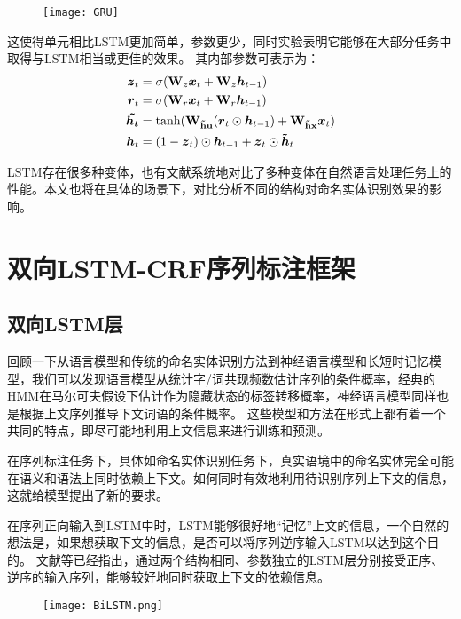\begin{figure}[H]
    \centering
    \texttt{[image: GRU]}
    \label{fig:GRU}
\end{figure}
这使得单元相比LSTM更加简单，参数更少，同时实验表明它能够在大部分任务中取得与LSTM相当或更佳的效果。
其内部参数可表示为：
\begin{align}
    \boldsymbol{z}_t &= \sigma(\boldsymbol{\mathbf{W}}_{z}\boldsymbol{x}_t + \boldsymbol{\mathbf{W}}_{z}\boldsymbol{h}_{t-1})\\
    \boldsymbol{r}_t &= \sigma(\boldsymbol{\mathbf{W}}_{r}\boldsymbol{x}_t + \boldsymbol{\mathbf{W}}_{r}\boldsymbol{h}_{t-1})\\
    \boldsymbol{\tilde{h_t}} &= \tanh(\boldsymbol{\mathbf{W_{\tilde{h}u}}}(\boldsymbol{r}_t \odot \boldsymbol{h}_{t-1}) + \boldsymbol{\mathbf{W_{\tilde{h}x}}}\boldsymbol{x}_t)\\
    \boldsymbol{h}_t &= (1 - \boldsymbol{z}_t) \odot \boldsymbol{h}_{t-1} + \boldsymbol{z}_t \odot \boldsymbol{\tilde{h}}_t
\end{align}

LSTM存在很多种变体，也有文献系统地对比了多种变体在自然语言处理任务上的性能。本文也将在具体的场景下，对比分析不同的结构对命名实体识别效果的影响。

\section{双向LSTM-CRF序列标注框架}
\subsection{双向LSTM层}
回顾一下从语言模型和传统的命名实体识别方法到神经语言模型和长短时记忆模型，我们可以发现语言模型从统计字/词共现频数估计序列的条件概率，经典的HMM在马尔可夫假设下估计作为隐藏状态的标签转移概率，神经语言模型同样也是根据上文序列推导下文词语的条件概率。
这些模型和方法在形式上都有着一个共同的特点，即尽可能地利用上文信息来进行训练和预测。

在序列标注任务下，具体如命名实体识别任务下，真实语境中的命名实体完全可能在语义和语法上同时依赖上下文。如何同时有效地利用待识别序列上下文的信息，这就给模型提出了新的要求。

在序列正向输入到LSTM中时，LSTM能够很好地“记忆”上文的信息，一个自然的想法是，如果想获取下文的信息，是否可以将序列逆序输入LSTM以达到这个目的。
文献\citep{huang2015bidirectional, ma2016end}等已经指出，通过两个结构相同、参数独立的LSTM层分别接受正序、逆序的输入序列，能够较好地同时获取上下文的依赖信息。

\begin{figure}[H]
    \centering
    \texttt{[image: BiLSTM.png]}
    \label{fig:BiLSTM}
\end{figure}

